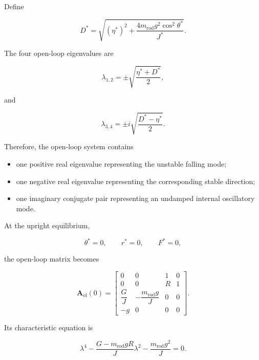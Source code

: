 Define

\begin{equation}
D^{*}
=
\sqrt{
(\eta^{*})^2
+
\frac{
4m_{\mathrm{rod}}g^2\cos^2\theta^{*}
}
{J^{*}}
}.
\end{equation}

The four open-loop eigenvalues are

\begin{equation}
\lambda_{1,2}
=
\pm
\sqrt{
\frac{\eta^{*}+D^{*}}{2}
},
\label{eq:open-loop-real-eigenvalues}
\end{equation}

and

\begin{equation}
\lambda_{3,4}
=
\pm i
\sqrt{
\frac{D^{*}-\eta^{*}}{2}
}.
\label{eq:open-loop-imaginary-eigenvalues}
\end{equation}

Therefore, the open-loop system contains

\begin{itemize}
    \item one positive real eigenvalue representing the unstable falling mode;
    \item one negative real eigenvalue representing the corresponding stable direction;
    \item one imaginary conjugate pair representing an undamped internal oscillatory mode.
\end{itemize}

At the upright equilibrium,

\begin{equation}
\theta^{*}=0,
\qquad
r^{*}=0,
\qquad
F^{*}=0,
\end{equation}

the open-loop matrix becomes

\begin{equation}
\mathbf{A}_{\mathrm{ol}}(0)
=
\begin{bmatrix}
0 & 0 & 1 & 0 \\
0 & 0 & R & 1 \\
\dfrac{G}{J}
&
-\dfrac{m_{\mathrm{rod}}g}{J}
&
0 & 0
\\[3mm]
-g & 0 & 0 & 0
\end{bmatrix}.
\label{eq:upright-open-loop-matrix}
\end{equation}

Its characteristic equation is

\begin{equation}
\lambda^4
-
\frac{
G-m_{\mathrm{rod}}gR
}
{J}
\lambda^2
-
\frac{
m_{\mathrm{rod}}g^2
}
{J}
=
0.
\label{eq:upright-open-loop-characteristic}
\end{equation}


